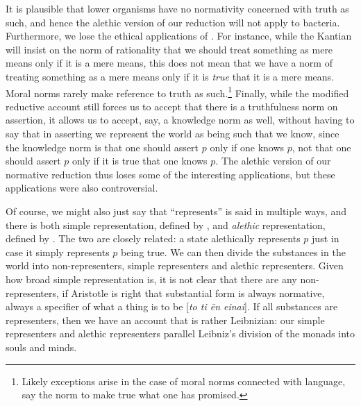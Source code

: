 It is plausible that lower organisms have no normativity concerned with truth as such, and hence the alethic
version  of our reduction will not apply to bacteria. Furthermore, we lose the ethical 
applications of . For instance, while the Kantian will insist on the norm of rationality
that we should treat something as mere means only if it is a mere means, this does not 
mean that we have a norm of treating something as a mere means only if it is \textit{true} that it is a mere
means. Moral norms rarely make reference to truth as such.\footnote{Likely exceptions arise in the case of
moral norms connected with language, say the norm to make true what one has promised.} Finally, while the modified reductive account still
forces us to accept that there is a truthfulness norm on assertion, it allows us to accept, say, a knowledge norm as 
well, without having to say that in asserting we represent the world as being such that we know, since the 
knowledge norm is that one should assert $p$ only if one knows $p$, not that one should assert $p$ only if 
it is true that one knows $p$. 
The alethic version  of our normative reduction thus loses some of the interesting applications,
but these applications were also controversial. 

Of course, we might also just say that ``represents'' is said in multiple ways, and there is both simple representation,
defined by , and \textit{alethic} representation, defined by . The two are 
closely related: a state alethically represents $p$ just in case it simply represents $p$ being true. We can then
divide the substances in the world into non-representers, simple representers and alethic representers. Given how 
broad simple representation is, it is not clear that there are any non-representers, if Aristotle is right that
substantial form is always normative, always a specifier of what a thing is to be [\textit{to ti \=en einai}]. If 
all substances are representers, then we have 
an account that is rather Leibnizian: our simple representers and alethic representers parallel Leibniz's 
division of the monads into souls and minds. 

